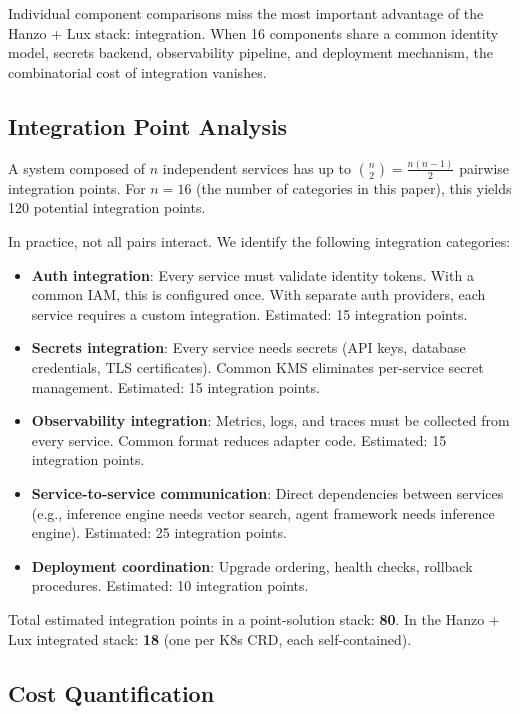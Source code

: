\documentclass[11pt,twocolumn]{article}
\begin{document}
Individual component comparisons miss the most important advantage of the Hanzo + Lux stack: integration. When 16 components share a common identity model, secrets backend, observability pipeline, and deployment mechanism, the combinatorial cost of integration vanishes.

\subsection{Integration Point Analysis}

A system composed of $n$ independent services has up to $\binom{n}{2} = \frac{n(n-1)}{2}$ pairwise integration points. For $n = 16$ (the number of categories in this paper), this yields 120 potential integration points.

In practice, not all pairs interact. We identify the following integration categories:

\begin{itemize}
    \item \textbf{Auth integration}: Every service must validate identity tokens. With a common IAM, this is configured once. With separate auth providers, each service requires a custom integration. Estimated: 15 integration points.
    \item \textbf{Secrets integration}: Every service needs secrets (API keys, database credentials, TLS certificates). Common KMS eliminates per-service secret management. Estimated: 15 integration points.
    \item \textbf{Observability integration}: Metrics, logs, and traces must be collected from every service. Common format reduces adapter code. Estimated: 15 integration points.
    \item \textbf{Service-to-service communication}: Direct dependencies between services (e.g., inference engine needs vector search, agent framework needs inference engine). Estimated: 25 integration points.
    \item \textbf{Deployment coordination}: Upgrade ordering, health checks, rollback procedures. Estimated: 10 integration points.
\end{itemize}

Total estimated integration points in a point-solution stack: \textbf{80}. In the Hanzo + Lux integrated stack: \textbf{18} (one per K8s CRD, each self-contained).

\subsection{Cost Quantification}
\end{document}

